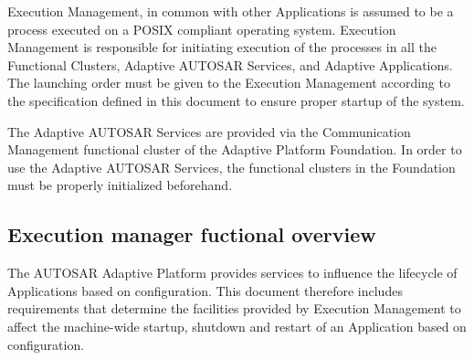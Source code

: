 Execution Management, in common with other Applications is assumed to be a process executed on a P\+O\+S\+IX compliant operating system. Execution Management is responsible for initiating execution of the processes in all the Functional Clusters, Adaptive A\+U\+T\+O\+S\+AR Services, and Adaptive Applications. The launching order must be given to the Execution Management according to the specification defined in this document to ensure proper startup of the system.

The Adaptive A\+U\+T\+O\+S\+AR Services are provided via the Communication Management functional cluster of the Adaptive Platform Foundation. In order to use the Adaptive A\+U\+T\+O\+S\+AR Services, the functional clusters in the Foundation must be properly initialized beforehand.

\subsection*{Execution manager fuctional overview}

The A\+U\+T\+O\+S\+AR Adaptive Platform provides services to influence the lifecycle of Applications based on configuration. This document therefore includes requirements that determine the facilities provided by Execution Management to affect the machine-\/wide startup, shutdown and restart of an Application based on configuration.


